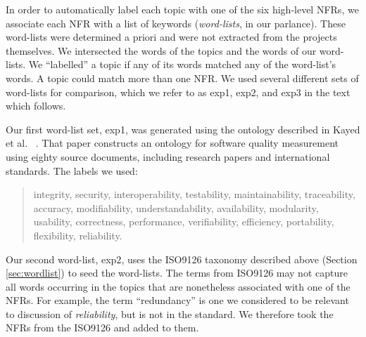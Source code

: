 \documentclass[smallextended]{svjour3}       %
\begin{document}

In order to automatically label each topic with 
one of the six high-level NFRs,
we associate each NFR with a list
of keywords (\emph{word-lists}, in our parlance). These word-lists were determined a priori and were not extracted from the projects themselves.
We intersected the words of the topics and the words of our word-lists.
We ``labelled'' a topic if any of its words matched any of the word-list's words.
A topic could match more than one NFR.
We used several different sets of word-lists for comparison, which we
refer to as \textsf{exp1}, \textsf{exp2}, and \textsf{exp3} in the text which follows. 

Our first word-list set, \textsf{exp1}, was generated using the ontology described in Kayed et al.~\cite{5072519} .
That paper constructs an ontology for software quality measurement using eighty source documents, including research papers and international standards. 
The labels we used:

\begin{quotation}
\small \noindent \textsf{
integrity, security,
interoperability, testability, maintainability, traceability,
accuracy, modifiability, understandability, availability, modularity,
usability, correctness, performance, verifiability, efficiency,
portability, flexibility, reliability.
}
\end{quotation}

Our second word-list, \textsf{exp2}, uses the ISO9126 taxonomy described above (Section \ref{sec:wordlist}) to seed the word-lists.
The terms from ISO9126 may not capture all words occurring in the topics that are nonetheless associated with one of the NFRs. 
For example, the term ``redundancy'' is one 
we considered to be
relevant to discussion of \emph{reliability}, but is not in the standard. 
We therefore took the NFRs from the ISO9126 and added to them.
\end{document}
